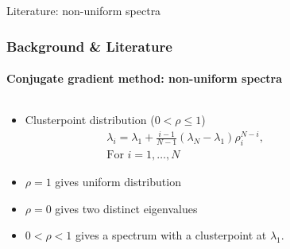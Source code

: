 \footerinfootnotestrue
\begin{frame}[label=background,fragile]{Literature: non-uniform spectra}
    \frametitle{Background \& Literature}
    \framesubtitle{Conjugate gradient method: non-uniform spectra}
    \begin{columns}[T,onlytextwidth]
        \begin{column}{.5\textwidth}
            \begin{itemize}
                \item<1-> Clusterpoint distribution ($0 < \rho \leq 1$)\cite{cg_convrate_Strakos1991}
                \begin{align*}
                    &\lambda_i = \lambda_1 + \frac{i-1}{N-1}(\lambda_N - \lambda_1)\rho_i^{N-i}, \\ 
                    &\text{For }i = 1, \dots, N
                \end{align*}
                \item<2-> $\rho = 1$ gives uniform distribution
                \item<3-> $\rho = 0$ gives two distinct eigenvalues
                \item<4-> $0<\rho<1$ gives a spectrum with a clusterpoint at $\lambda_1$.
            \end{itemize}
        \end{column}
        \begin{column}{.45\textwidth}
        \end{column}
    \end{columns}
\end{frame}

